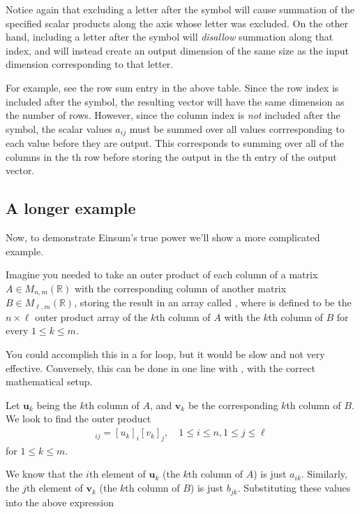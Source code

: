 \begin{info}
Notice again that excluding a letter after the \li{->} symbol will cause summation of the specified scalar products along the axis whose letter was excluded.
On the other hand, including a letter after the \li{->} symbol will \emph{disallow} summation along that index, and will instead create an output dimension of the same size as the input dimension corresponding to that letter.

\noindent For example, see the row sum entry in the above table.
Since the row index  is included after the \li{->} symbol, the resulting vector will have the same dimension as the number of rows.
However, since the column index  is \emph{not} included after the \li{->} symbol, the scalar values $a_{ij}$ must be summed over all  values corrresponding to each  value before they are output.
This corresponds to summing over all of the columns in the th row before storing the output in the th entry of the output vector.
\end{info}

\subsection*{A longer example}

Now, to demonstrate Einsum's true power we'll show a more complicated example.

Imagine you needed to take an outer product of each column of a matrix $A \in M_{n,m}(\mathbb{R})$ with the corresponding column of another matrix $B \in M_{\ell,m}(\mathbb{R})$, storing the result in an array called , where  is defined to be the $n \times \ell$ outer product array of the $k$th column of $A$ with the $k$th column of $B$ for every $1 \leq k \leq m$.

You could accomplish this in a for loop, but it would be slow and not very effective.
Conversely, this can be done in one line with , with the correct mathematical setup.

Let $\mathbf{u}_k$ being the $k$th column of $A$, and $ \mathbf{v}_k$ be the corresponding $k$th column of $B$.
We look to find the outer product
\begin{align*}
	[\mathbf{u}_k \otimes \mathbf{v}_k]_{ij} = [u_{k}]_{i} [v_{k}]_{j}, \quad 1 \leq i \leq n, 1 \leq j \leq \ell
\end{align*}
for $1 \leq k \leq m$.

We know that the $i$th element of $\mathbf{u}_k$ (the $k$th column of $A$) is just $a_{ik}$. Similarly, the $j$th element of $\mathbf{v}_{k}$ (the $k$th column of $B$) is just $b_{jk}$. Substituting these values into the above expression

